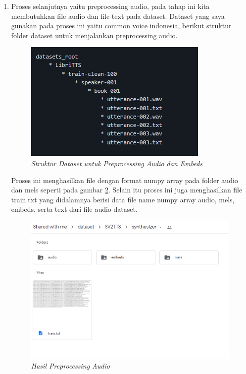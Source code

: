 \begin{enumerate}
\item Proses selanjutnya yaitu preprocessing audio, pada tahap ini kita membutuhkan file audio dan file text pada dataset. Dataset yang saya gunakan pada proses ini yaitu common voice indonesia, berikut struktur folder dataset untuk menjalankan preprocessing audio.
\begin{figure}[H]
    \centering
    \includegraphics[scale=0.75]{figures/hasil12}
    \caption{\textit{Struktur Dataset untuk Preprocessing Audio dan Embeds}}
    \label{hasil12}
\end{figure}

Proses ini menghasilkan file dengan format numpy array pada folder audio dan mels seperti pada gambar \ref{hasil13}. Selain itu proses ini juga menghasilkan file train.txt yang didalamnya berisi data file name numpy array audio, mels, embeds, serta text dari file audio dataset.

\begin{figure}[H]
    \centering
    \includegraphics[scale=0.75]{figures/hasil13}
    \caption{\textit{Hasil Preprocessing Audio}}
    \label{hasil13}
\end{figure}


\end{enumerate}
